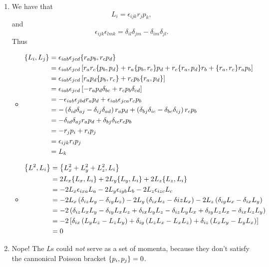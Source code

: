 \documentclass[12pt]{article}
\begin{document}
\begin{enumerate}[label=\roman*.]
    \item We have that
    \[ L_i = \epsilon_{ijk}r_jp_k, \]
    and
    \[ \epsilon_{ijk}\epsilon_{lmk} = \delta_{il}\delta_{jm} - \delta_{im}\delta_{jl}. \]
    Thus
    \begin{itemize}
        \item
        \begin{align*}
            \poissonbracket{L_i}{L_j} &= \epsilon_{iab}\epsilon_{jcd}\poissonbracket{r_ap_b}{r_cp_d} \\
            &= \epsilon_{iab}\epsilon_{jcd}\left[r_ar_c\poissonbracket{p_b}{p_d} + r_a\poissonbracket{p_b}{r_c}p_d + r_c\poissonbracket{r_a}{p_d}r_b + \poissonbracket{r_a}{r_c}r_ap_b\right] \\
            &= \epsilon_{iab}\epsilon_{jcd}\left[r_ap_d\poissonbracket{p_b}{r_c} + r_cp_b\poissonbracket{r_a}{p_d}\right] \\
            &= \epsilon_{iab}\epsilon_{jcd}\left[-r_ap_d\delta_{bc} + r_cp_b\delta_{cd}\right] \\ 
            &= -\epsilon_{iab}\epsilon_{jbd}r_ap_d + \epsilon_{iab}\epsilon_{jca}r_cp_b \\
            &= -\left(\delta_{id}\delta_{aj} - \delta_{ij}\delta_{ad}\right)r_ap_d + \left(\delta_{bj}\delta_{ic} - \delta_{bc}\delta_{ij}\right)r_cp_b \\
            &= -\delta_{id}\delta_{aj}r_ap_d +  \delta_{bj}\delta_{ic}r_cp_b \\
            &= -r_jp_i + r_ip_j \\
            &= \epsilon_{ijk}r_ip_j \\
            &= L_k
        \end{align*}
        \item 
        \begin{align*}
            \poissonbracket{L^2}{L_i} &= \poissonbracket{L_x^2 + L_y^2 + L_z^2}{L_i} \\
            &= 2L_x\poissonbracket{L_x}{L_i} + 2L_y\poissonbracket{L_y}{L_i} + 2L_z\poissonbracket{L_z}{L_i} \\
            &= -2L_x\epsilon_{ixa}L_a - 2L_y\epsilon_{iyb}L_b - 2L_z\epsilon_{izc}L_c \\
            &= -2L_x\left(\delta_{iz}L_y - \delta_{iy}L_z\right) - 2L_y\left(\delta_{ix}L_z - \delta{iz}L_x\right) - 2L_z\left(\delta_{iy}L_x - \delta_{ix}L_y\right) \\
            &= -2\left(\delta_{iz}L_xL_y - \delta_{iy}L_xL_z + \delta_{ix}L_yL_z - \delta_{iz}L_yL_x + \delta_{iy}L_zL_x - \delta_{ix}L_zL_y\right) \\
            &= -2\left[\delta_{ix}\left(L_yL_z - L_zL_y\right) + \delta_{iy}\left(L_zL_x - L_xL_z\right) + \delta_{iz}\left(L_xL_y - L_yL_x\right)\right] \\
            &= 0
        \end{align*}
    \end{itemize}

    \item Nope! The $L$s could \textit{not} serve as a set of momenta, because they don't satisfy the cannonical Poisson bracket $\poissonbracket{p_i}{p_j} = 0$.
\end{enumerate}
\end{document}

